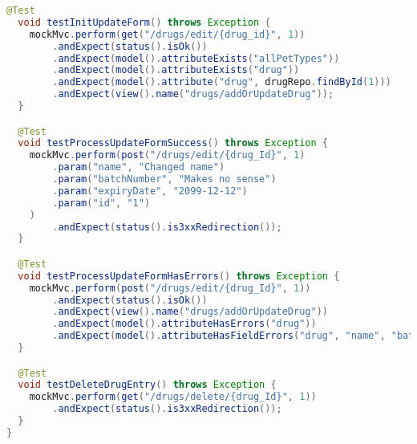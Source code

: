 \documentclass[12pt, a4paper]{article}
\begin{document}
\begin{lstlisting}[language=Java, title='DrugControllerTests.java']
  @Test
  void testInitUpdateForm() throws Exception {
    mockMvc.perform(get("/drugs/edit/{drug_id}", 1))
        .andExpect(status().isOk())
        .andExpect(model().attributeExists("allPetTypes"))
        .andExpect(model().attributeExists("drug"))
        .andExpect(model().attribute("drug", drugRepo.findById(1)))
        .andExpect(view().name("drugs/addOrUpdateDrug"));
  }

  @Test
  void testProcessUpdateFormSuccess() throws Exception {
    mockMvc.perform(post("/drugs/edit/{drug_Id}", 1)
        .param("name", "Changed name")
        .param("batchNumber", "Makes no sense")
        .param("expiryDate", "2099-12-12")
        .param("id", "1")
    )
        .andExpect(status().is3xxRedirection());
  }

  @Test
  void testProcessUpdateFormHasErrors() throws Exception {
    mockMvc.perform(post("/drugs/edit/{drug_Id}", 1))
        .andExpect(status().isOk())
        .andExpect(view().name("drugs/addOrUpdateDrug"))
        .andExpect(model().attributeHasErrors("drug"))
        .andExpect(model().attributeHasFieldErrors("drug", "name", "batchNumber", "expiryDate"));
  }

  @Test
  void testDeleteDrugEntry() throws Exception {
    mockMvc.perform(get("/drugs/delete/{drug_Id}", 1))
        .andExpect(status().is3xxRedirection());
  }
}
\end{lstlisting}
\end{document}
